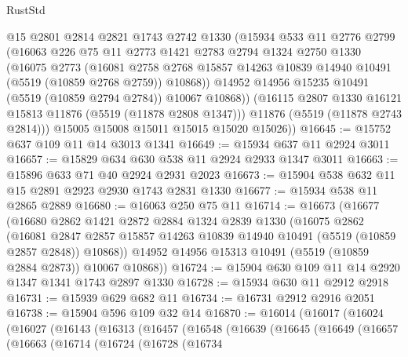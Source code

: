 \begin{lexlean}{RustStd}
\begin{coremodule}
          @15
          @2801
          @2814
          @2821
          @1743
          @2742
          @1330
          (@15934
            @533
            @11
            @2776
            @2799
            (@16063
              @226
              @75
              @11
              @2773
              @1421
              @2783
              @2794
              @1324
              @2750
              @1330
              (@16075
                @2773
                (@16081
                  @2758
                  @2768
                  @15857
                  @14263
                  @10839
                  @14940
                  @10491
                  (@5519 (@10859 @2768 @2759))
                  @10868))
              @14952
              @14956
              @15235
              @10491
              (@5519 (@10859 @2794 @2784))
              @10067
              @10868))
          (@16115 @2807 @1330 @16121 @15813 @11876 (@5519 (@11878 @2808 @1347)))
          @11876
          (@5519 (@11878 @2743 @2814)))
        @15005
        @15008
        @15011
        @15015
        @15020
        @15026))
@16645 := @15752 @637 @109 @11 @14 @3013 @1341
@16649 := @15934 @637 @11 @2924 @3011
@16657 := @15829 @634 @630 @538 @11 @2924 @2933 @1347 @3011
@16663 := @15896 @633 @71 @40 @2924 @2931 @2023
@16673 := @15904 @538 @632 @11 @15 @2891 @2923 @2930 @1743 @2831 @1330
@16677 := @15934 @538 @11 @2865 @2889
@16680 := @16063 @250 @75 @11
@16714 := @16673
    (@16677
      (@16680
        @2862
        @1421
        @2872
        @2884
        @1324
        @2839
        @1330
        (@16075
          @2862
          (@16081
            @2847
            @2857
            @15857
            @14263
            @10839
            @14940
            @10491
            (@5519 (@10859 @2857 @2848))
            @10868))
        @14952
        @14956
        @15313
        @10491
        (@5519 (@10859 @2884 @2873))
        @10067
        @10868))
@16724 := @15904 @630 @109 @11 @14 @2920 @1347 @1341 @1743 @2897 @1330
@16728 := @15934 @630 @11 @2912 @2918
@16731 := @15939 @629 @682 @11
@16734 := @16731 @2912 @2916 @2051
@16738 := @15904 @596 @109 @32 @14
@16870 := @16014
    (@16017
      (@16024
        (@16027
          (@16143
            (@16313
              (@16457
                (@16548
                  (@16639
                    (@16645
                      (@16649
                        (@16657
                          (@16663
                            (@16714
                              (@16724
                                (@16728
                                  (@16734

\end{coremodule}
\end{lexlean}
